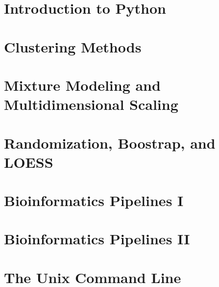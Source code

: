 \documentclass[10pt,oneside,bigheadings,tablecaptionabove]{scrbook}
\begin{document}
\chapter{Introduction to Python}


% 
% 
% 
% 
% 


\chapter{Clustering Methods}


\chapter{Mixture Modeling and Multidimensional Scaling}


\chapter{Randomization, Boostrap, and LOESS}


\chapter{Bioinformatics Pipelines I}


% 

\chapter{Bioinformatics Pipelines II}


\appendix
\chapter{The Unix Command Line}



%
%
% 
% 
\end{document}
